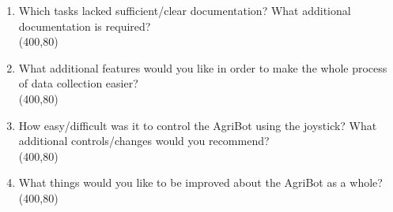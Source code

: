 \documentclass[10pt,a4paper]{article}
\begin{document}
\begin{enumerate}
	\item Which tasks lacked sufficient/clear documentation? What additional documentation is required?  \\ 
		\framebox(400,80){} 
		
	\item What additional features would you like in order to make the whole process
	of data collection easier?  \\ 
		\framebox(400,80){}
		
	\item How easy/difficult was it to control the AgriBot using the joystick? What additional controls/changes would you recommend? \\	
		\framebox(400,80){}				
	
	\item What things would you like to be improved about the AgriBot as a whole?\\	
		\framebox(400,80){}				
\end{enumerate}
\end{document}

